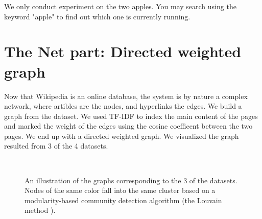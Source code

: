 \documentclass[12pt]{amsart}
\newcommand{\0}{\mat{0}}
\newcommand{\1}{\mathds{1}}
\begin{document}
We only conduct experiment on the two apples. You may search using the keyword "apple" to find out which one is currently running. 


\section{The Net part: Directed weighted graph}
\label{sec:net}
Now that Wikipedia is an online database, the system is by nature a complex network, where artibles are the nodes, and hyperlinks the edges. We build a graph from the dataset. We used TF-IDF to index the main content of the pages and marked the weight of the edges using the cosine coefficent between the two pages. We end up with a directed weighted graph. We visualized the graph resulted from 3 of the 4 datasets. 

\begin{figure}[htb]
\centering
{}
~
~
\caption{An illustration of the graphs corresponding to the 3 of the datasets. Nodes of the same color fall into the same cluster based on a modularity-based community detection algorithm (the Louvain method \cite{blondel2008fast}).}
\label{fig:net}
\end{figure}
\end{document}
